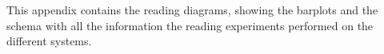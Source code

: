 This appendix contains the reading diagrams, showing the barplots and the schema with all the information the reading experiments performed on the different systems.